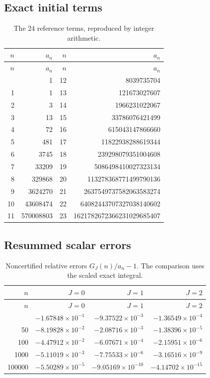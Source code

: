\documentclass[11pt,letterpaper]{article}
\numberwithin{equation}{section}
\theoremstyle{remark}\newtheorem{remark}[theorem]{Remark}
\begin{document}
\subsection{Exact initial terms}
\begin{longtable}{rrrr}
\caption{The 24 reference terms, reproduced by integer arithmetic.}\label{stc:s1:tab:terms}\\
\toprule $n$ & $a_n$ & $n$ & $a_n$ \\ \midrule
\endfirsthead
\toprule $n$ & $a_n$ & $n$ & $a_n$ \\ \midrule
\endhead
\bottomrule\endfoot
0 & 1 & 12 & 8039735704 \\
1 & 1 & 13 & 121673027607 \\
2 & 3 & 14 & 1966231022067 \\
3 & 13 & 15 & 33786076421499 \\
4 & 72 & 16 & 615043147866660 \\
5 & 481 & 17 & 11822938288619344 \\
6 & 3745 & 18 & 239298079351004608 \\
7 & 33209 & 19 & 5086498410027323134 \\
8 & 329868 & 20 & 113278368771499790136 \\
9 & 3624270 & 21 & 2637549737582063583274 \\
10 & 43608474 & 22 & 64082443707327038140602 \\
11 & 570008803 & 23 & 1621782672366231029685407 \\
\end{longtable}
\subsection{Resummed scalar errors}
\begin{longtable}{rrrr}
\caption{Noncertified relative errors $G_J(n)/a_n-1$. The comparison uses the scaled exact integral.}\label{stc:s1:tab:resummed}\\
\toprule $n$ & $J=0$ & $J=1$ & $J=2$ \\ \midrule
\endfirsthead
\toprule $n$ & $J=0$ & $J=1$ & $J=2$ \\ \midrule
\endhead
\bottomrule\endfoot
20 & $-1.67848\times10^{-1}$ & $-9.37522\times10^{-3}$ & $-1.36549\times10^{-4}$ \\
50 & $-8.19828\times10^{-2}$ & $-2.08716\times10^{-3}$ & $-1.38396\times10^{-5}$ \\
100 & $-4.47912\times10^{-2}$ & $-6.07671\times10^{-4}$ & $-2.15951\times10^{-6}$ \\
1000 & $-5.11019\times10^{-3}$ & $-7.75533\times10^{-6}$ & $-3.16516\times10^{-9}$ \\
100000 & $-5.50289\times10^{-5}$ & $-9.05169\times10^{-10}$ & $-4.14702\times10^{-15}$ \\
\end{longtable}
\end{document}
